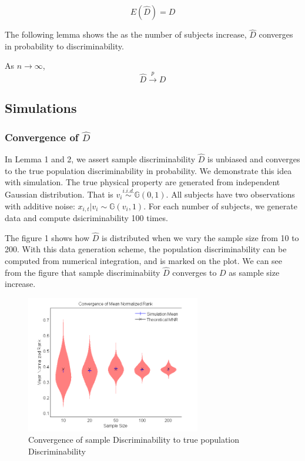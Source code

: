 \documentclass{article}
\begin{document}
\begin{lem}	
	\[ E(\hat{D}) = D\]
\end{lem}

The following lemma shows the as the number of subjects increase, $\hat{D}$ converges in probability to discriminability.
\begin{lem}	
As $n \rightarrow \infty$,
\[\hat{D} \overset{p}{\rightarrow} D \]
\end{lem}

\subsection{Simulations}

\subsubsection{Convergence of $\hat{D}$}
In Lemma 1 and 2, we assert sample discriminability $\hat{D}$ is unbiased and converges to  the true population discriminability in probability. We demonstrate this idea with simulation. The true physical property are generated from independent Gaussian distribution. That is $v_i \overset{i.i.d.}{\sim} \mathbb{G}(0,1)$. All subjects have two observations with additive noise: $x_{i,t} | v_i \sim \mathbb{G}(v_i,1)$. For each number of subjects, we generate data and compute dsicriminability 100 times. 

The figure 1 shows how $\hat{D}$ is distributed when we vary the sample size from 10 to 200. With this data generation scheme, the population discriminability can be computed from numerical integration, and is marked on the plot. We can see from the figure that sample discriminabiity $\hat{D}$ converges to $D$ as sample size increase.

\begin{figure}[t!]
\includegraphics[width=3.0in]{../Figs/simumnr_violin.png}
\caption{Convergence of sample Discriminability to true population Discriminability}
\label{fig:1}
\end{figure}
\end{document}
